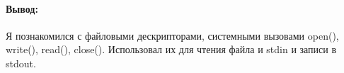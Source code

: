 \paragraph{Вывод:}
Я познакомился с файловыми дескрипторами, системными вызовами open(), write(), read(), close().
Использовал их для чтения файла и stdin и записи в stdout.